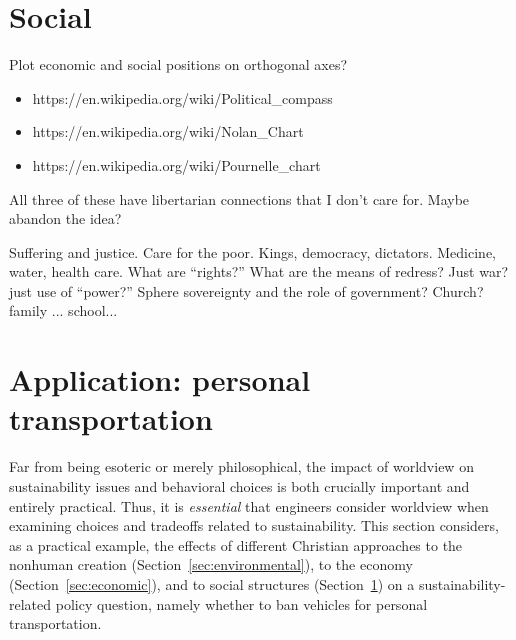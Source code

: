 \documentclass[12pt]{article}
\begin{document}



\section{Social}
\label{sec:social}

Plot economic and social positions on orthogonal axes?
\begin{itemize}
\item{https://en.wikipedia.org/wiki/Political\_compass}
\item{https://en.wikipedia.org/wiki/Nolan\_Chart}
\item{https://en.wikipedia.org/wiki/Pournelle\_chart}
\end{itemize}
All three of these have libertarian connections that I don't care for. Maybe abandon the idea?

Suffering and justice. Care for the poor. 
Kings, democracy, dictators.
Medicine, water, health care. What are ``rights?''
What are the means of redress?
Just war? just use of ``power?''
Sphere sovereignty and the role of government? Church? family ... school...


\section{Application: personal transportation}
\label{sec:personal_transportation}

Far from being esoteric or merely philosophical, 
the impact of worldview on sustainability issues and behavioral choices 
is both crucially important and entirely practical. 
Thus, it is \emph{essential} that engineers consider worldview
when examining choices and tradeoffs related to sustainability.
This section considers, as a practical example, the effects of different Christian approaches
to the nonhuman creation (Section~\ref{sec:environmental}),
to the economy (Section~\ref{sec:economic}), and 
to social structures (Section~\ref{sec:social})
on a sustainability-related policy question, 
namely whether to ban vehicles for personal transportation.
\end{document}
